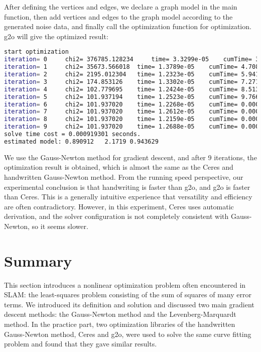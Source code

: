 After defining the vertices and edges, we declare a graph model in the main function, then add vertices and edges to the graph model according to the generated noise data, and finally call the optimization function for optimization. g2o will give the optimized result:
\begin{lstlisting}[language=sh,caption=terminal output:]
start optimization
iteration= 0	 chi2= 376785.128234	 time= 3.3299e-05	 cumTime= 3.3299e-05	 edges= 100	 schur= 0
iteration= 1	 chi2= 35673.566018	 time= 1.3789e-05	 cumTime= 4.7088e-05	 edges= 100	 schur= 0
iteration= 2	 chi2= 2195.012304	 time= 1.2323e-05	 cumTime= 5.9411e-05	 edges= 100	 schur= 0
iteration= 3	 chi2= 174.853126	 time= 1.3302e-05	 cumTime= 7.2713e-05	 edges= 100	 schur= 0
iteration= 4	 chi2= 102.779695	 time= 1.2424e-05	 cumTime= 8.5137e-05	 edges= 100	 schur= 0
iteration= 5	 chi2= 101.937194	 time= 1.2523e-05	 cumTime= 9.766e-05	 edges= 100	 schur= 0
iteration= 6	 chi2= 101.937020	 time= 1.2268e-05	 cumTime= 0.000109928	 edges= 100	 schur= 0
iteration= 7	 chi2= 101.937020	 time= 1.2612e-05	 cumTime= 0.00012254	 edges= 100	 schur= 0
iteration= 8	 chi2= 101.937020	 time= 1.2159e-05	 cumTime= 0.000134699	 edges= 100	 schur= 0
iteration= 9	 chi2= 101.937020	 time= 1.2688e-05	 cumTime= 0.000147387	 edges= 100	 schur= 0
solve time cost = 0.000919301 seconds. 
estimated model: 0.890912   2.1719 0.943629
\end{lstlisting}

We use the Gauss-Newton method for gradient descent, and after 9 iterations, the optimization result is obtained, which is almost the same as the Ceres and handwritten Gauss-Newton method. From the running speed perspective, our experimental conclusion is that handwriting is faster than g2o, and g2o is faster than Ceres. This is a generally intuitive experience that versatility and efficiency are often contradictory. However, in this experiment, Ceres uses automatic derivation, and the solver configuration is not completely consistent with Gauss-Newton, so it seems slower.

\section{Summary}
This section introduces a nonlinear optimization problem often encountered in SLAM: the least-squares problem consisting of the sum of squares of many error terms. We introduced its definition and solution and discussed two main gradient descent methods: the Gauss-Newton method and the Levenberg-Marquardt method. In the practice part, two optimization libraries of the handwritten Gauss-Newton method, Ceres and g2o, were used to solve the same curve fitting problem and found that they gave similar results.

